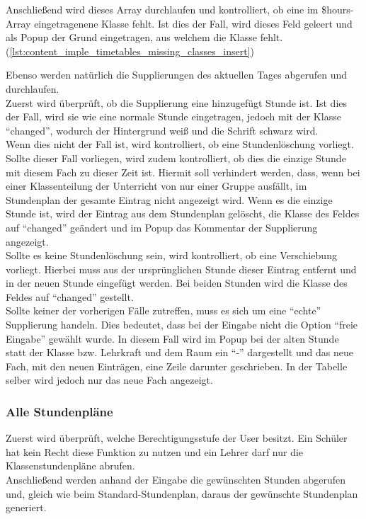  Anschließend wird dieses Array durchlaufen und kontrolliert, ob eine im \$hours-Array eingetragenene Klasse fehlt. Ist dies der Fall, wird dieses Feld geleert und als Popup der Grund eingetragen, aus welchem die Klasse fehlt. (\autoref{lst:content_imple_timetables_missing_classes_insert})
 

Ebenso werden natürlich die Supplierungen des aktuellen Tages abgerufen und durchlaufen. \\
Zuerst wird überprüft, ob die Supplierung eine hinzugefügt Stunde ist. Ist dies der Fall, wird sie wie eine normale Stunde eingetragen, jedoch mit der Klasse \enquote{changed}, wodurch der Hintergrund weiß und die Schrift schwarz wird.\\
Wenn dies nicht der Fall ist, wird kontrolliert, ob eine Stundenlöschung vorliegt. Sollte dieser Fall vorliegen, wird zudem kontrolliert, ob dies die einzige Stunde mit diesem Fach zu dieser Zeit ist. Hiermit soll verhindert werden, dass, wenn bei einer Klassenteilung der Unterricht von nur einer Gruppe ausfällt, im Stundenplan der gesamte Eintrag nicht angezeigt wird. Wenn es die einzige Stunde ist, wird der Eintrag aus dem Stundenplan gelöscht, die Klasse des Feldes auf \enquote{changed} geändert und im Popup das Kommentar der Supplierung angezeigt.\\
Sollte es keine Stundenlöschung sein, wird kontrolliert, ob eine Verschiebung vorliegt. Hierbei muss aus der ursprünglichen Stunde dieser Eintrag entfernt und in der neuen Stunde eingefügt werden. Bei beiden Stunden wird die Klasse des Feldes auf \enquote{changed} gestellt.\\
Sollte keiner der vorherigen Fälle zutreffen, muss es sich um eine \enquote{echte} Supplierung handeln. Dies bedeutet, dass bei der Eingabe nicht die Option \enquote{freie Eingabe} gewählt wurde. In diesem Fall wird im Popup bei der alten Stunde statt der Klasse bzw. Lehrkraft und dem Raum ein \enquote{-} dargestellt und das neue Fach, mit den neuen Einträgen, eine Zeile darunter geschrieben. In der Tabelle selber wird jedoch nur das neue Fach angezeigt.



\subsubsection{Alle Stundenpläne}
Zuerst wird überprüft, welche Berechtigungsstufe der User besitzt. Ein Schüler hat kein Recht diese Funktion zu nutzen und ein Lehrer darf nur die Klassenstundenpläne abrufen.\\



Anschließend werden anhand der Eingabe die gewünschten Stunden abgerufen und, gleich wie beim Standard-Stundenplan, daraus der gewünschte Stundenplan generiert.